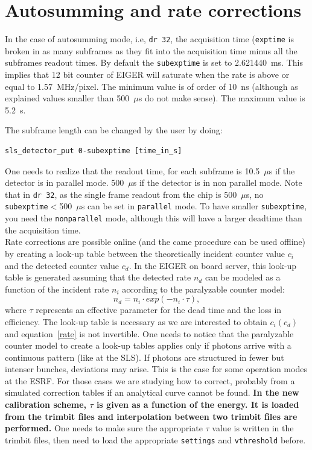 \documentclass{article}
\newcommand{\E}{EIGER\xspace}
\begin{document}
{{{\section{Autosumming and rate corrections} \label{advanced}

In the case of autosumming mode, i.e, {\tt{dr 32}}, the acquisition time ({\tt{exptime}} is broken in as many subframes as they fit into the acquisition time minus all the subframes readout times. By default the {\tt{subexptime}} is set to 2.621440~ms. This implies that 12 bit counter of \E will saturate when the rate is above or equal to 1.57~MHz/pixel. The minimum value is of order of 10~ns (although as explained values smaller than 500~$\mu$s do not make sense). The maximum value is 5.2~s.

The subframe length can be changed by the user by doing: 
\begin{verbatim}
sls_detector_put 0-subexptime [time_in_s] 
\end{verbatim}

One needs to realize that the readout time, for each subframe is 10.5~$\mu$s if the detector is in parallel mode. 500~$\mu$s if the detector is in non parallel mode. Note that in {\tt{dr 32}}, as the single frame readout from the chip is 500~$\mu$s, no {\tt{subexptime}}$<$500~$\mu$s can be set in {\tt{parallel}} mode. To have smaller {\tt{subexptime}}, you need the {\tt{nonparallel}} mode, although this will have a larger deadtime than the acquisition time.\\

Rate corrections are possible online (and the came procedure can be used offline) by creating a look-up table between the theoretically incident counter value $c_i$ and the detected counter value $c_d$. 
In the EIGER on board server, this look-up table is generated assuming that the detected rate $n_d$ can be modeled as a function of the incident rate $n_i$ according to the paralyzable counter model:
\begin{equation}
n_d= n_i \cdot exp(-n_i \cdot \tau),
\label{rate}
\end{equation}
where $\tau$ represents an effective parameter for the dead time and the loss in efficiency. The look-up table is necessary as we are interested to obtain $c_i(c_d)$ and equation~\ref{rate} is not invertible. One needs to notice that the paralyzable counter model to create a look-up tables applies only if photons arrive with a continuous pattern (like at the SLS). If photons are structured in fewer but intenser bunches, deviations may arise. This is the case for some operation modes at the ESRF. For those cases we are studying how to correct, probably from a simulated correction tables if an analytical curve cannot be found.  
\textbf{In the new calibration scheme, $\tau$ is given as a function of the energy. It is loaded from the trimbit files and interpolation between two trimbit files are performed.} One needs to make sure the appropriate $\tau$ value is written in the trimbit files, then need to load the appropriate {\tt{settings}} and {\tt{vthreshold}} before.

}}}
\end{document}
